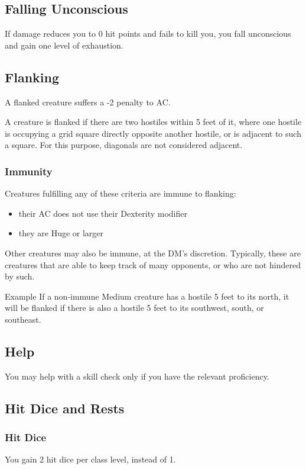 \documentclass[letterpaper,twocolumn,openany,nodeprecatedcode]{dndbook}
\begin{document}
\subsection{Falling Unconscious}
If damage reduces you to 0 hit points and fails to kill you, you fall unconscious and gain one level of exhaustion.

\subsection{Flanking}

A flanked creature suffers a -2 penalty to AC.

A creature is flanked if there are two hostiles within 5 feet of it, where one hostile is occupying a grid square directly opposite another hostile, or is adjacent to such a square. For this purpose, diagonals are not considered adjacent.

\subsubsection{Immunity}
Creatures fulfilling any of these criteria are immune to flanking:
\begin{itemize}
    \item their AC does not use their Dexterity modifier
    \item they are Huge or larger
\end{itemize}
Other creatures may also be immune, at the DM's discretion. Typically, these are creatures that are able to keep track of many opponents, or who are not hindered by such.

\begin{DndComment}{Example}
If a non-immune Medium creature has a hostile 5 feet to its north, it will be flanked if there is also a hostile 5 feet to its southwest, south, or southeast.
\end{DndComment}

\subsection{Help}
You may help with a skill check only if you have the relevant proficiency.

\subsection{Hit Dice and Rests}
\subsubsection{Hit Dice}
You gain 2 hit dice per class level, instead of 1.
\end{document}
